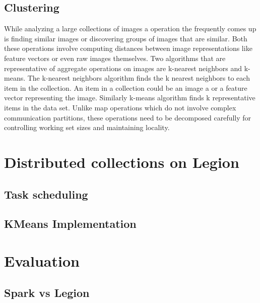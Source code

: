 \documentclass[tog]{acmsiggraph}
\begin{document}
\subsection{Clustering}

While analyzing a large collections of images a operation the frequently comes
up is finding similar images or discovering groups of images that are similar.
Both these operations involve computing distances between image representations
like feature vectors or even raw images themselves. Two algorithms that are
representative of aggregate operations on images are k-nearest neighbors and
k-means. The k-nearest neighbors algorithm finds the k nearest neighbors to each
item in the collection. An item in a collection could be an image a or a feature
vector representing the image. Similarly k-means algorithm finds k
representative items in the data set. Unlike map operations which do not involve
complex communication partitions, these operations need to be decomposed
carefully for controlling working set sizes and maintaining locality.

\section{Distributed collections on Legion}

\subsection{}


\subsection{Task scheduling}

\subsection{KMeans Implementation}

\section{Evaluation}

\subsection{Spark vs Legion}
\end{document}
